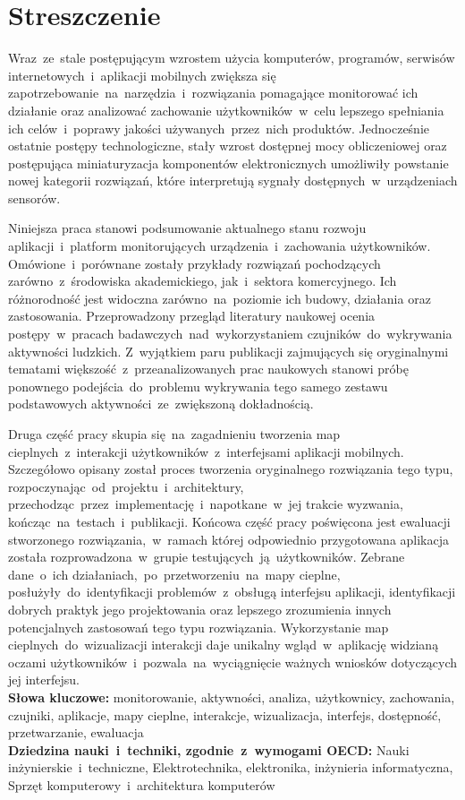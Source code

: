 \chapter*{Streszczenie}
Wraz~ze~stale postępującym wzrostem użycia komputerów, programów, serwisów internetowych~i~aplikacji mobilnych zwiększa się zapotrzebowanie~na~narzędzia~i~rozwiązania pomagające monitorować ich działanie oraz analizować zachowanie użytkowników~w~celu lepszego spełniania ich celów~i~poprawy jakości używanych~przez~nich produktów. Jednocześnie ostatnie postępy technologiczne, stały wzrost dostępnej mocy obliczeniowej oraz postępująca miniaturyzacja komponentów elektronicznych umożliwiły powstanie nowej kategorii rozwiązań, które interpretują sygnały dostępnych~w~urządzeniach sensorów. 

Niniejsza praca stanowi podsumowanie aktualnego stanu rozwoju aplikacji~i~platform monitorujących urządzenia~i~zachowania użytkowników. Omówione~i~porównane zostały przykłady rozwiązań pochodzących zarówno~z~środowiska akademickiego, jak~i~sektora komercyjnego. Ich różnorodność jest widoczna zarówno~na~poziomie ich budowy, działania oraz zastosowania. Przeprowadzony przegląd literatury naukowej ocenia postępy~w~pracach badawczych~nad~wykorzystaniem czujników~do~wykrywania aktywności ludzkich. Z~wyjątkiem paru publikacji zajmujących się oryginalnymi tematami większość~z~przeanalizowanych prac naukowych stanowi próbę ponownego podejścia~do~problemu wykrywania tego samego zestawu podstawowych aktywności~ze~zwiększoną dokładnością. 

Druga część pracy skupia się~na~zagadnieniu tworzenia map cieplnych~z~interakcji użytkowników~z~interfejsami aplikacji mobilnych. Szczegółowo opisany został proces tworzenia oryginalnego rozwiązania tego typu, rozpoczynając~od~projektu~i~architektury, przechodząc~przez~implementację~i~napotkane~w~jej trakcie wyzwania, kończąc~na~testach~i~publikacji. Końcowa część pracy poświęcona jest ewaluacji stworzonego rozwiązania,~w~ramach której odpowiednio przygotowana aplikacja została rozprowadzona~w~grupie testujących~ją~użytkowników. Zebrane dane~o~ich działaniach,~po~przetworzeniu~na~mapy cieplne, posłużyły~do~identyfikacji problemów~z~obsługą interfejsu aplikacji, identyfikacji dobrych praktyk jego projektowania oraz lepszego zrozumienia innych potencjalnych zastosowań tego typu rozwiązania. Wykorzystanie map cieplnych~do~wizualizacji interakcji daje unikalny wgląd~w~aplikację widzianą oczami użytkowników~i~pozwala~na~wyciągnięcie ważnych wniosków dotyczących jej interfejsu. \\

\noindent\textbf{Słowa kluczowe:} monitorowanie, aktywności, analiza, użytkownicy, zachowania, czujniki, aplikacje, mapy cieplne, interakcje, wizualizacja, interfejs, dostępność, przetwarzanie, ewaluacja \\

\noindent\textbf{Dziedzina nauki~i~techniki, zgodnie~z~wymogami OECD:} Nauki inżynierskie~i~techniczne, Elektrotechnika, elektronika, inżynieria informatyczna, Sprzęt komputerowy~i~architektura komputerów
